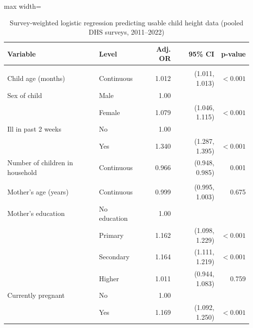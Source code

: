 \begin{table}[htbp]
\centering
\caption{Survey-weighted logistic regression predicting usable child height data (pooled DHS surveys, 2011--2022)}
\label{tab:logit_main}
\begin{threeparttable}


\small
\renewcommand{\arraystretch}{1.12}
\setlength{\tabcolsep}{6pt}
\begin{adjustbox}{max width=\textwidth}
\begin{tabularx}{\textwidth}{X l r r r}
\toprule
\textbf{Variable} & \textbf{Level} & \textbf{Adj. OR} & \textbf{95\% CI} & \textbf{p-value} \\
\midrule

\addlinespace[3pt]
\multicolumn{5}{l}{\textbf{Child characteristics}}\\
\addlinespace[2pt]

Child age (months) & Continuous & 1.012 & (1.011, 1.013) & \(<0.001\) \\

Sex of child & Male   & 1.00 &  &  \\
             & Female & 1.079 & (1.046, 1.115) & \(<0.001\) \\

Ill in past 2 weeks & No  & 1.00 &  &  \\
                   & Yes & 1.340 & (1.287, 1.395) & \(<0.001\) \\

Number of children in household & Continuous & 0.966 & (0.948, 0.985) & 0.001 \\

\addlinespace[4pt]
\multicolumn{5}{l}{\textbf{Maternal characteristics}}\\
\addlinespace[2pt]

Mother's age (years) & Continuous & 0.999 & (0.995, 1.003) & 0.675 \\

Mother's education & No education & 1.00 &  &  \\
                  & Primary   & 1.162 & (1.098, 1.229) & \(<0.001\) \\
                  & Secondary & 1.164 & (1.111, 1.219) & \(<0.001\) \\
                  & Higher    & 1.011 & (0.944, 1.083) & 0.759 \\

Currently pregnant & No  & 1.00 &  &  \\
                  & Yes & 1.169 & (1.092, 1.250) & \(<0.001\) \\


\end{tabularx}
\end{adjustbox}
\end{threeparttable}
\end{table}
